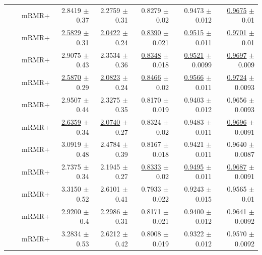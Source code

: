 \begin{longtable}{llp{}rrrrr}
 &  & mRMR+ & 2.8419 {\scriptsize $\pm$ 0.37} & 2.2759 {\scriptsize $\pm$ 0.31} & 0.8279 {\scriptsize $\pm$ 0.02} & 0.9473 {\scriptsize $\pm$ 0.012} & \underline{0.9675} {\scriptsize $\pm$ 0.01} \\
 &  & mRMR+ & \underline{2.5829} {\scriptsize $\pm$ 0.31} & \underline{2.0422} {\scriptsize $\pm$ 0.24} & \underline{0.8390} {\scriptsize $\pm$ 0.021} & \underline{0.9515} {\scriptsize $\pm$ 0.011} & \underline{0.9701} {\scriptsize $\pm$ 0.01} \\
 &  & mRMR+ & 2.9075 {\scriptsize $\pm$ 0.43} & 2.3534 {\scriptsize $\pm$ 0.36} & \underline{0.8348} {\scriptsize $\pm$ 0.018} & \underline{0.9521} {\scriptsize $\pm$ 0.0099} & \underline{0.9697} {\scriptsize $\pm$ 0.009} \\
 &  & mRMR+ & \underline{2.5870} {\scriptsize $\pm$ 0.29} & \underline{2.0823} {\scriptsize $\pm$ 0.24} & \underline{0.8466} {\scriptsize $\pm$ 0.02} & \underline{0.9566} {\scriptsize $\pm$ 0.011} & \underline{0.9724} {\scriptsize $\pm$ 0.0093} \\
 &  & mRMR+ & 2.9507 {\scriptsize $\pm$ 0.44} & 2.3275 {\scriptsize $\pm$ 0.35} & 0.8170 {\scriptsize $\pm$ 0.019} & 0.9403 {\scriptsize $\pm$ 0.012} & 0.9656 {\scriptsize $\pm$ 0.0093} \\
 &  & mRMR+ & \underline{2.6359} {\scriptsize $\pm$ 0.34} & \underline{2.0740} {\scriptsize $\pm$ 0.27} & 0.8324 {\scriptsize $\pm$ 0.02} & 0.9483 {\scriptsize $\pm$ 0.011} & \underline{0.9696} {\scriptsize $\pm$ 0.0091} \\
 &  & mRMR+ & 3.0919 {\scriptsize $\pm$ 0.48} & 2.4784 {\scriptsize $\pm$ 0.39} & 0.8167 {\scriptsize $\pm$ 0.018} & 0.9421 {\scriptsize $\pm$ 0.011} & 0.9640 {\scriptsize $\pm$ 0.0087} \\
 &  & mRMR+ & 2.7375 {\scriptsize $\pm$ 0.34} & 2.1945 {\scriptsize $\pm$ 0.27} & \underline{0.8333} {\scriptsize $\pm$ 0.02} & \underline{0.9495} {\scriptsize $\pm$ 0.011} & \underline{0.9687} {\scriptsize $\pm$ 0.0091} \\
 &  & mRMR+ & 3.3150 {\scriptsize $\pm$ 0.52} & 2.6101 {\scriptsize $\pm$ 0.41} & 0.7933 {\scriptsize $\pm$ 0.022} & 0.9243 {\scriptsize $\pm$ 0.015} & 0.9565 {\scriptsize $\pm$ 0.01} \\
 &  & mRMR+ & 2.9200 {\scriptsize $\pm$ 0.4} & 2.2986 {\scriptsize $\pm$ 0.31} & 0.8171 {\scriptsize $\pm$ 0.021} & 0.9400 {\scriptsize $\pm$ 0.012} & 0.9641 {\scriptsize $\pm$ 0.0092} \\
 &  & mRMR+ & 3.2834 {\scriptsize $\pm$ 0.53} & 2.6212 {\scriptsize $\pm$ 0.42} & 0.8008 {\scriptsize $\pm$ 0.019} & 0.9322 {\scriptsize $\pm$ 0.012} & 0.9570 {\scriptsize $\pm$ 0.0092} \\

\end{longtable}
